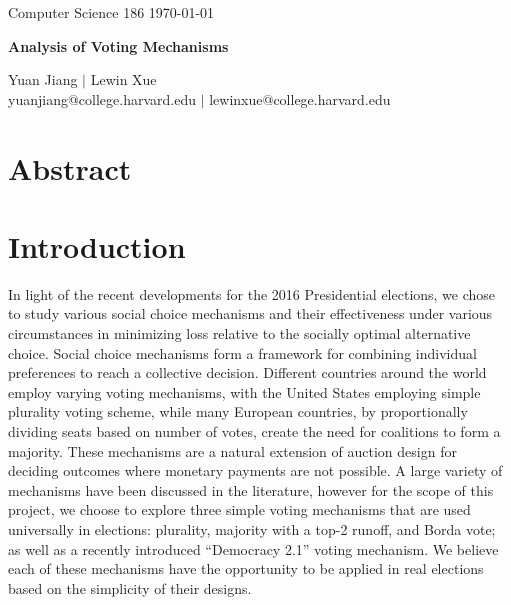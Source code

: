 \documentclass[11pt]{scrartcl}
\begin{document}


\noindent Computer Science 186 \hfill \today\\
\noindent\makebox[\linewidth]{\rule{6.5in}{2.0pt}}

\begin{center}


{{\LARGE \bf Analysis of Voting Mechanisms}}

\noindent\makebox[\linewidth]{\rule{6.5in}{2.0pt}}

\vspace{3mm}

{\large Yuan Jiang $|$ Lewin Xue} \\
\normalsize yuanjiang@college.harvard.edu $|$ lewinxue@college.harvard.edu \\

\end{center}


\vspace{2mm}

\section{Abstract}

\section{Introduction}

In light of the recent developments for the 2016 Presidential elections, we chose to study various social choice mechanisms and their effectiveness under various circumstances in minimizing loss relative to the socially optimal alternative choice. Social choice mechanisms form a framework for combining individual preferences to reach a collective decision. Different countries around the world employ varying voting mechanisms, with the United States employing simple plurality voting scheme, while many European countries, by proportionally dividing seats based on number of votes, create the need for coalitions to form a majority. These mechanisms are a natural extension of auction design for deciding outcomes where monetary payments are not possible. A large variety of mechanisms have been discussed in the literature, however for the scope of this project, we choose to explore three simple voting mechanisms that are used universally in elections: plurality, majority with a top-2 runoff, and Borda vote; as well as a recently introduced ``Democracy 2.1'' voting mechanism. We believe each of these mechanisms have the opportunity to be applied in real elections based on the simplicity of their designs.\\
\end{document}
